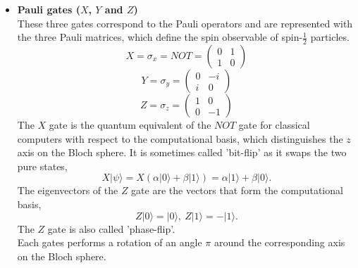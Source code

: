 \begin{itemize}
    \item \textbf{Pauli gates ($X$, $Y$ and $Z$)} \\
    These three gates correspond to the Pauli operators and are represented with the three Pauli matrices, which define the spin observable of spin-$\frac{1}{2}$ particles.
    \begin{equation}
        X = \sigma_x = NOT = \left( \begin{array}{cc} 0 & 1 \\
                                                1 & 0 \end{array} \right)
    \end{equation}
    \begin{equation}
        Y = \sigma_y = \left( \begin{array}{cc} 0 & -i \\
                                                i & 0 \end{array} \right)
    \end{equation}
    \begin{equation}
        Z = \sigma_z = \left( \begin{array}{cc} 1 & 0 \\
                                                0 & -1 \end{array} \right)
    \end{equation}
    The $X$ gate is the quantum equivalent of the $NOT$ gate for classical computers with respect to the computational basis, which distinguishes the $z$ axis on the Bloch sphere. It is sometimes called 'bit-flip' as it swaps the two pure states,
    \begin{equation}
        X|\psi\rangle = X (\alpha |0\rangle + \beta |1\rangle) = \alpha |1\rangle + \beta |0\rangle.
    \end{equation}
    The eigenvectors of the $Z$ gate are the vectors that form the computational basis,
    \begin{equation}
        Z|0\rangle = |0\rangle, \ Z|1\rangle = -|1\rangle.
    \end{equation}
    The $Z$ gate is also called 'phase-flip'. \\
    Each gates performs a rotation of an angle $\pi$ around the corresponding axis on the Bloch sphere.
    

\end{itemize}
